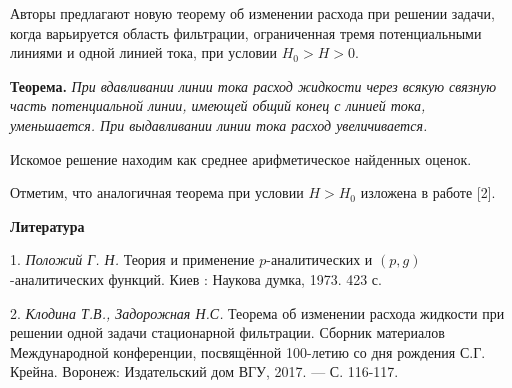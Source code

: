 Авторы предлагают новую теорему об изменении расхода при решении задачи, когда варьируется
область фильтрации, ограниченная тремя потенциальными линиями и одной линией тока, при условии
$H_0>H>0$.

\textbf{Теорема.} {\it При вдавливании линии тока расход жидкости через всякую
связную часть потенциальной линии, имеющей общий конец с линией тока, уменьшается.
При выдавливании линии тока расход увеличивается.}

Искомое решение находим как среднее арифметическое найденных оценок.

Отметим, что аналогичная теорема при условии $H>H_0$ изложена в работе [2].

\smallskip \centerline {\bf Литература} \nopagebreak

1. {\it Положий Г. Н.} Теория и применение $p$-аналитических
и $(p,g)$-аналитических функций. Киев : Наукова думка, 1973. 423 с.

2. {\it Клодина Т.В., Задорожная Н.С.} Теорема об изменении расхода жидкости при решении
одной задачи стационарной фильтрации. Сборник материалов Международной конференции,
посвящённой 100-летию со дня рождения С.Г. Крейна. Воронеж: Издательский дом ВГУ, 2017. — С. 116-117.
